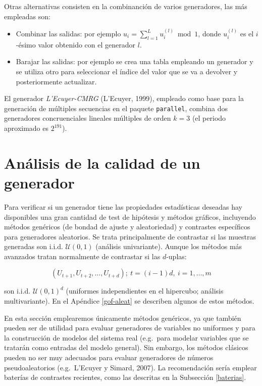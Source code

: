 \documentclass[
]{book}
\theoremstyle{break}
\theoremstyle{definition}
\theoremstyle{definition}
\theoremstyle{definition}
\theoremstyle{definition}
\theoremstyle{remark}
\begin{document}
Otras alternativas consisten en la combinanción de varios generadores, las más empleadas son:

\begin{itemize}
\item
  Combinar las salidas: por ejemplo \(u_{i}=\sum_{l=1}^L u_{i}^{(l)} \bmod 1\), donde \(u_{i}^{(l)}\) es el \(i\)-ésimo valor obtenido con el generador \(l\).
\item
  Barajar las salidas: por ejemplo se crea una tabla empleando un generador y se utiliza otro para seleccionar el índice del valor que se va a devolver y posteriormente actualizar.
\end{itemize}

El generador \emph{L'Ecuyer-CMRG} (L'Ecuyer, 1999), empleado como base para la generación de múltiples secuencias en el paquete \texttt{parallel}, combina dos generadores concruenciales lineales múltiples de orden \(k=3\) (el periodo aproximado es \(2^{191}\)).

\hypertarget{calgen}{%
\section{Análisis de la calidad de un generador}\label{calgen}}

Para verificar si un generador tiene las propiedades estadísticas deseadas hay disponibles una gran cantidad de test de hipótesis y métodos gráficos,
incluyendo métodos genéricos (de bondad de ajuste y aleatoriedad) y contrastes específicos para generadores aleatorios.
Se trata principalmente de contrastar si las muestras generadas son i.i.d. \(\mathcal{U}\left(0,1\right)\) (análisis univariante).
Aunque los métodos más avanzados tratan normalmente de contrastar si las \(d\)-uplas:

\[(U_{t+1},U_{t+2},\ldots,U_{t+d}); \ t=(i-1)d, \ i=1,\ldots,m\]

son i.i.d. \(\mathcal{U}\left(0,1\right)^{d}\) (uniformes independientes en el hipercubo; análisis multivariante).
En el Apéndice \ref{gof-aleat} se describen algunos de estos métodos.

En esta sección emplearemos únicamente métodos genéricos, ya que también pueden ser de utilidad para evaluar generadores de variables no uniformes y para la construcción de modelos del sistema real (e.g.~para modelar variables que se tratarán como entradas del modelo general).
Sin embargo, los métodos clásicos pueden no ser muy adecuados para evaluar generadores de números pseudoaleatorios (e.g.~L'Ecuyer y Simard, 2007).
La recomendación sería emplear baterías de contrastes recientes, como las descritas en la Subsección \ref{baterias}.
\end{document}
